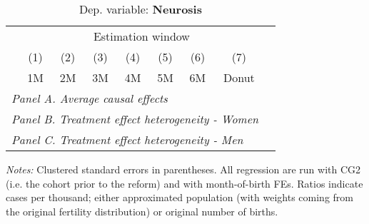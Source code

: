  \begin{table}[H] \begin{threeparttable} \centering \caption{Dep. variable: \textbf{Neurosis}} {\def\sym#1{\ifmmode^{#1}\else\(^{#1}\)\fi} \begin{tabular}{l*{8}{c}} \toprule & \multicolumn{7}{c}{Estimation window} \\ \cmidrule(lr){2-8}
            &\multicolumn{1}{c}{(1)}&\multicolumn{1}{c}{(2)}&\multicolumn{1}{c}{(3)}&\multicolumn{1}{c}{(4)}&\multicolumn{1}{c}{(5)}&\multicolumn{1}{c}{(6)}&\multicolumn{1}{c}{(7)}\\
            &\multicolumn{1}{c}{1M}&\multicolumn{1}{c}{2M}&\multicolumn{1}{c}{3M}&\multicolumn{1}{c}{4M}&\multicolumn{1}{c}{5M}&\multicolumn{1}{c}{6M}&\multicolumn{1}{c}{Donut}\\
\midrule
 \multicolumn{8}{l}{\emph{Panel A. Average causal effects}} \\       \midrule\multicolumn{8}{l}{\emph{Panel B. Treatment effect heterogeneity - Women}} \\       \midrule\multicolumn{8}{l}{\emph{Panel C. Treatment effect heterogeneity - Men}} \\       
\bottomrule \end{tabular} } \begin{tablenotes} \item \scriptsize \emph{Notes:} Clustered standard errors in parentheses. All regression are run with CG2 (i.e. the cohort prior to the reform) and with month-of-birth FEs. Ratios indicate cases per thousand; either approximated population (with weights coming from the original fertility distribution) or original number of births. \end{tablenotes} \end{threeparttable} \end{table} 
